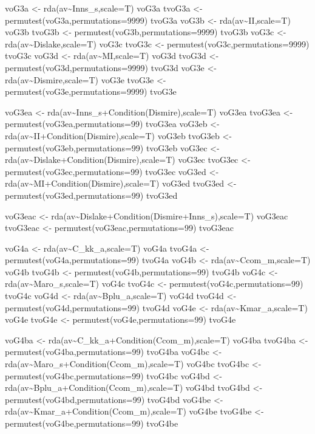 \documentclass[]{article}
\begin{document}
voG3a \textless{}- rda(av\textasciitilde{}Inns\_s,scale=T) voG3a tvoG3a
\textless{}- permutest(voG3a,permutations=9999) tvoG3a voG3b
\textless{}- rda(av\textasciitilde{}II,scale=T) voG3b tvoG3b
\textless{}- permutest(voG3b,permutations=9999) tvoG3b voG3c
\textless{}- rda(av\textasciitilde{}Dislake,scale=T) voG3c tvoG3c
\textless{}- permutest(voG3c,permutations=9999) tvoG3c voG3d
\textless{}- rda(av\textasciitilde{}MI,scale=T) voG3d tvoG3d
\textless{}- permutest(voG3d,permutations=9999) tvoG3d voG3e
\textless{}- rda(av\textasciitilde{}Dismire,scale=T) voG3e tvoG3e
\textless{}- permutest(voG3e,permutations=9999) tvoG3e

voG3ea \textless{}-
rda(av\textasciitilde{}Inns\_s+Condition(Dismire),scale=T) voG3ea
tvoG3ea \textless{}- permutest(voG3ea,permutations=99) tvoG3ea voG3eb
\textless{}- rda(av\textasciitilde{}II+Condition(Dismire),scale=T)
voG3eb tvoG3eb \textless{}- permutest(voG3eb,permutations=99) tvoG3eb
voG3ec \textless{}-
rda(av\textasciitilde{}Dislake+Condition(Dismire),scale=T) voG3ec
tvoG3ec \textless{}- permutest(voG3ec,permutations=99) tvoG3ec voG3ed
\textless{}- rda(av\textasciitilde{}MI+Condition(Dismire),scale=T)
voG3ed tvoG3ed \textless{}- permutest(voG3ed,permutations=99) tvoG3ed

voG3eac \textless{}-
rda(av\textasciitilde{}Dislake+Condition(Dismire+Inns\_s),scale=T)
voG3eac tvoG3eac \textless{}- permutest(voG3eac,permutations=99)
tvoG3eac

voG4a \textless{}- rda(av\textasciitilde{}C\_kk\_a,scale=T) voG4a tvoG4a
\textless{}- permutest(voG4a,permutations=99) tvoG4a voG4b \textless{}-
rda(av\textasciitilde{}Ccom\_m,scale=T) voG4b tvoG4b \textless{}-
permutest(voG4b,permutations=99) tvoG4b voG4c \textless{}-
rda(av\textasciitilde{}Maro\_s,scale=T) voG4c tvoG4c \textless{}-
permutest(voG4c,permutations=99) tvoG4c voG4d \textless{}-
rda(av\textasciitilde{}Bplu\_a,scale=T) voG4d tvoG4d \textless{}-
permutest(voG4d,permutations=99) tvoG4d voG4e \textless{}-
rda(av\textasciitilde{}Kmar\_a,scale=T) voG4e tvoG4e \textless{}-
permutest(voG4e,permutations=99) tvoG4e

voG4ba \textless{}-
rda(av\textasciitilde{}C\_kk\_a+Condition(Ccom\_m),scale=T) voG4ba
tvoG4ba \textless{}- permutest(voG4ba,permutations=99) tvoG4ba voG4bc
\textless{}- rda(av\textasciitilde{}Maro\_s+Condition(Ccom\_m),scale=T)
voG4bc tvoG4bc \textless{}- permutest(voG4bc,permutations=99) tvoG4bc
voG4bd \textless{}-
rda(av\textasciitilde{}Bplu\_a+Condition(Ccom\_m),scale=T) voG4bd
tvoG4bd \textless{}- permutest(voG4bd,permutations=99) tvoG4bd voG4be
\textless{}- rda(av\textasciitilde{}Kmar\_a+Condition(Ccom\_m),scale=T)
voG4be tvoG4be \textless{}- permutest(voG4be,permutations=99) tvoG4be
\end{document}
